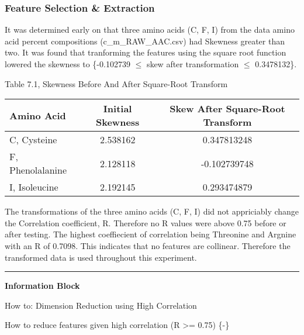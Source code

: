\documentclass[]{article}
\begin{document}
\hypertarget{feature-selection-extraction}{%
\subsubsection{Feature Selection \&
Extraction}\label{feature-selection-extraction}}

It was determined early on that three amino acids (C, F, I) from the
data amino acid percent compositions (c\_m\_RAW\_AAC.csv) had Skewness
greater than two. It was found that tranforming the features using the
square root function lowered the skewness to \{-0.102739 \(\leq\) skew
after transformation \(\leq\) 0.3478132\}.

Table 7.1, Skewness Before And After Square-Root Transform

\begin{longtable}[]{@{}lcc@{}}
\toprule
Amino Acid & Initial Skewness & Skew After Square-Root
Transform\tabularnewline
\midrule
\endhead
C, Cysteine & 2.538162 & 0.347813248\tabularnewline
F, Phenolalanine & 2.128118 & -0.102739748\tabularnewline
I, Isoleucine & 2.192145 & 0.293474879\tabularnewline
\bottomrule
\end{longtable}

The transformations of the three amino acids (C, F, I) did not
appriciably change the Correlation coefficient, R. Therefore no R values
were above 0.75 before or after testing. The highest coeffiecient of
correlation being Threonine and Argnine with an R of 0.7098. This
indicates that no features are collinear. Therefore the transformed data
is used throughout this experiment.

\begin{center}\rule{0.5\linewidth}{0.5pt}\end{center}

\textbf{Information Block}

How to: Dimension Reduction using High Correlation

How to reduce features given high correlation (\textbar{}R\textbar{}
\textgreater{}= 0.75) \{-\}
\end{document}
